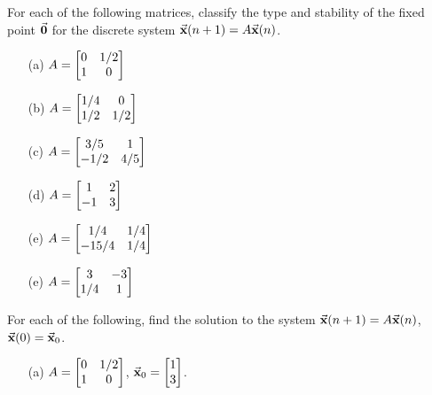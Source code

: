 \begin{exercises}
\begin{exercise}
For each of the following matrices, classify the
type and stability of the fixed point $\vec{\textbf{0}}$
for the discrete system $\vec{\textbf{x}}(n+1) = A\vec{\textbf{x}}(n)$.
\begin{enumerate}
\item[(a)]
$\displaystyle A  =  \begin{bmatrix}
              0 & 1/2 \\
              1 & 0
           \end{bmatrix}$
\item[(b)]
$\displaystyle A  =  \begin{bmatrix}
              1/4 & 0 \\
              1/2 & 1/2
           \end{bmatrix}$
\item[(c)]
$\displaystyle A  =  \begin{bmatrix}
              3/5 & 1 \\
              -1/2 & 4/5
           \end{bmatrix}$
\item[(d)]
$\displaystyle A  =  \begin{bmatrix}
              1 & 2 \\
              -1 & 3
           \end{bmatrix}$
\item[(e)]
$\displaystyle A  =  \begin{bmatrix}
              1/4 & 1/4 \\
              -15/4 & 1/4
           \end{bmatrix}$
\item[(e)]
$\displaystyle A  =  \begin{bmatrix}
              3 & -3 \\
              1/4 & 1
           \end{bmatrix}$
\end{enumerate}
\end{exercise}
\begin{exercise}
For each of the following, find the solution to the
system $\vec{\textbf{x}}(n+1)=A\vec{\textbf{x}}(n)$, $\vec{\textbf{x}}(0)=\vec{\textbf{x}}_0$.
\begin{enumerate}
\item[(a)]
$\displaystyle A  =  \begin{bmatrix}
              0 & 1/2 \\
              1 & 0
           \end{bmatrix}$, \hspace*{.25cm} 
$\displaystyle \vec{\textbf{x}}_0 = \begin{bmatrix} 1 \\ 3 \end{bmatrix}$.

\end{enumerate}
\end{exercise}
\end{exercises}
